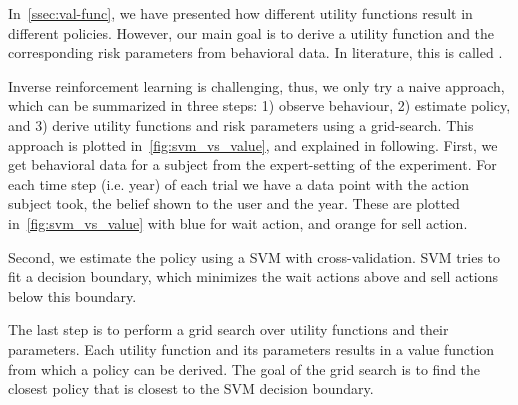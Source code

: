In~\autoref{ssec:val-func}, we have presented how different utility functions result in different policies.
However, our main goal is to derive a utility function and the corresponding risk parameters from behavioral data.
In literature, this is called  \cite{TODO}.

Inverse reinforcement learning is challenging, thus, we only try a naive approach, which can be summarized in three steps: 1) observe behaviour, 2) estimate policy, and 3) derive utility functions and risk parameters using a grid-search.
This approach is plotted in~\autoref{fig:svm_vs_value}, and explained in following. 
First, we get behavioral data for a subject from the expert-setting of the experiment.
For each time step (i.e. year) of each trial we have a data point with the action subject took, the belief shown to the user and the year. These are plotted in~\autoref{fig:svm_vs_value} with blue for wait action, and orange for sell action.

Second, we estimate the policy using a SVM \cite{TODO} with cross-validation. SVM tries to fit a decision boundary, which minimizes the wait actions above and sell actions below this boundary.


The last step is to perform a grid search over utility functions and their parameters.
Each utility function and its parameters results in a value function from which a policy can be derived.
The goal of the grid search is to find the closest policy that is closest to the SVM decision boundary.

